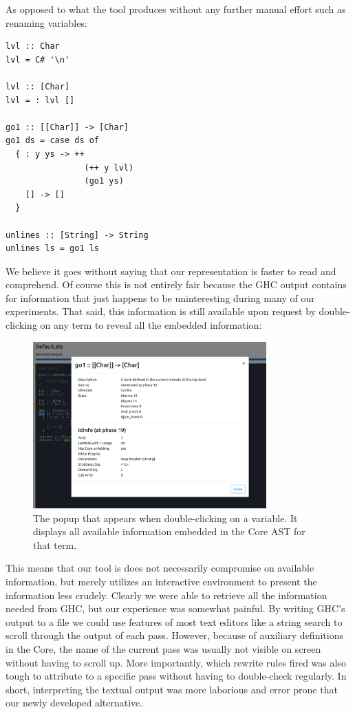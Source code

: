 As opposed to what the tool produces without any further manual effort such as renaming variables:

\begin{listing}[H]
\begin{verbatim}
lvl :: Char
lvl = C# '\n'

lvl :: [Char]
lvl = : lvl []

go1 :: [[Char]] -> [Char]
go1 ds = case ds of
  { : y ys -> ++
                (++ y lvl)
                (go1 ys)
    [] -> []
  }

unlines :: [String] -> String
unlines ls = go1 ls
\end{verbatim}
\end{listing}

We believe it goes without saying that our representation is faster to read and comprehend. Of course this is not entirely
fair because the GHC output contains for information that just happens to be uninteresting during many of our experiments.
That said, this information is still available upon request by double-clicking on any term to reveal all the embedded information:

\begin{figure}[H]
\centering
\includegraphics[width=0.8\textwidth]{figs/var_popup.png}
\caption{The popup that appears when double-clicking on a variable. It displays all available information embedded in the Core AST for that term.}
\label{fig:var-popup}
\end{figure}

This means that our tool is does not necessarily compromise on available information, but merely utilizes an interactive environment
to present the information less crudely. Clearly we were able to retrieve all the information needed from GHC, but our experience was
somewhat painful. By writing GHC's output to a file we could use features of most text editors like a string search to scroll through
the output of each pass. However, because of auxiliary definitions in the Core, the name of the current pass was usually not visible on
screen without having to scroll up. More importantly, which rewrite rules fired was also tough to attribute to a specific pass without
having to double-check regularly. In short, interpreting the textual output was more laborious and error prone that our newly developed
alternative.

